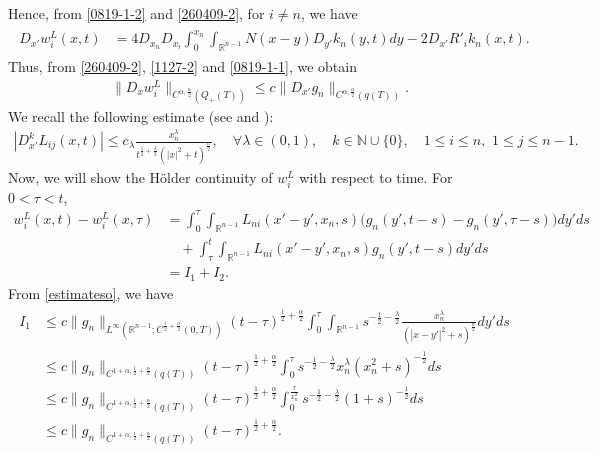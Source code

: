 \documentclass{amsart}
\numberwithin{equation}{section}
\newcommand {\la}{\lambda}
\newcommand {\al}{\alpha}
\newcommand{\Rn}{{\mathbb R}^{n-1}}
\begin{document}
Hence, from \eqref{0819-1-2} and \eqref{260409-2}, for $i \neq n$, we have 
\begin{align}\label{0819-1-1}
\begin{split}
D_{x'} w_{i}^L(x,t) &= 4 D_{x_n} D_{x_i} \int_0^{x_n} \int_{\Rn} N(x-y) D_{y'} k_n(y,t) dy - 2 D_{x'} R'_i k_n(x,t).
\end{split}
\end{align}
Thus, from \eqref{260409-2}, \eqref{1127-2} and \eqref{0819-1-1}, we obtain 
\begin{align}\label{1127-3}
\| D_{x} w_{i}^L \|_{C^{\al,\frac{\al}2}(Q_+(T))} \leq c \| D_{x'} g_n \|_{C^{\al,\frac{\al}2}(q(T))}.
\end{align}
We recall the following estimate (see \cite[Section 3]{KS} and  \cite[Section 2]{So}):
\begin{align}\label{estimateso}
|D^k_{x'} L_{ij}(x,t)| \leq c_\la \frac{x_n^\la}{t^{\frac12+\frac{\la}2}(|x|^2 + t)^{\frac{n}2}}, \quad \forall \la \in (0, 1), \quad k \in \mathbb{N} \cup \{0\}, \quad 1 \leq i \leq n, \,\, 1 \leq j \leq n-1.
\end{align}
Now, we will show the H\"{o}lder continuity of $w_i^L$ with respect to time. For $0 < \tau < t$, 
\begin{align*}
 w^{L}_{i}(x,t) - w^{L}_{i}(x,\tau) &= \int_0^\tau \int_{\Rn} L_{ni}(x'-y', x_n, s) \Big( g_n(y',t-s) - g_n(y', \tau-s) \Big) dy' ds \\
&\quad + \int_\tau^t \int_{\Rn} L_{ni}(x'-y', x_n, s) g_n(y',t- s) dy' ds \\
&= I_1 + I_2.
\end{align*}
From \eqref{estimateso}, we have 
\begin{align*}
\begin{split}
I_1 &\leq c \| g_n \|_{L^\infty(\Rn; C^{\frac12 + \frac{\al}2}(0, T))} (t -\tau)^{\frac12 + \frac{\al}2} \int_0^\tau \int_{\Rn} s^{-\frac12 -\frac{\la}2} \frac{x_n^\la}{(|x-y'|^2 + s)^{\frac{n}2}} dy' ds \\
&\leq c \| g_n \|_{C^{1 +\al, \frac12 + \frac{\al}2}(q(T))} (t -\tau)^{\frac12 + \frac{\al}2} \int_0^\tau s^{-\frac12 -\frac{\la}2} x_n^\la (x_n^2 + s)^{-\frac12} ds \\
&\leq c \| g_n \|_{C^{1 +\al, \frac12 + \frac{\al}2}(q(T))} (t -\tau)^{\frac12 + \frac{\al}2} \int_0^{\frac{\tau}{x_n^2}} s^{-\frac12 -\frac{\la}2} (1 + s)^{-\frac12} ds \\
&\leq c \| g_n \|_{C^{1 +\al, \frac12 + \frac{\al}2}(q(T))} (t -\tau)^{\frac12 + \frac{\al}2}.
\end{split}
\end{align*}
\end{document}
